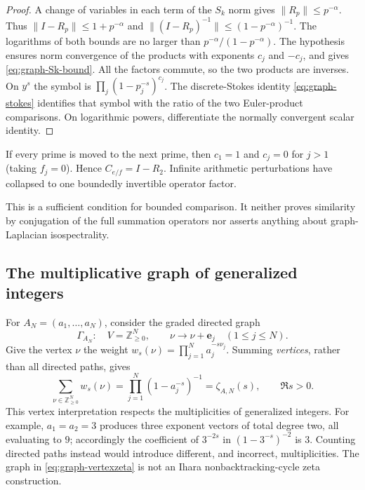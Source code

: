 \begin{proof}
A change of variables in each term of the $S_k$ norm gives
$\|R_p\|\le p^{-\alpha}$. Thus
$\|I-R_p\|\le1+p^{-\alpha}$ and
$\|(I-R_p)^{-1}\|\le(1-p^{-\alpha})^{-1}$.
The logarithms of both bounds are no larger than
$p^{-\alpha}/(1-p^{-\alpha})$.
The hypothesis ensures norm convergence of the products
with exponents $c_j$ and $-c_j$, and gives
\eqref{eq:graph-Sk-bound}. All the factors commute, so the
two products are inverses.
On $y^s$ the symbol is
$\prod_j(1-p_j^{-s})^{c_j}$.
The discrete-Stokes identity \eqref{eq:graph-stokes}
identifies that symbol with the ratio of the two
Euler-product comparisons. On logarithmic powers,
differentiate the normally convergent scalar identity.
\end{proof}

\begin{example}
If every prime is moved to the next prime, then
$c_1=1$ and $c_j=0$ for $j>1$ (taking $f_j=0$).
Hence $C_{e/f}=I-R_2$. Infinite arithmetic
perturbations have collapsed to one boundedly invertible
operator factor.
\end{example}

\begin{remark}
This is a sufficient condition for bounded comparison.
It neither proves similarity by conjugation of the full
summation operators nor asserts anything about graph-Laplacian
isospectrality.
\end{remark}

\subsection{The multiplicative graph of generalized integers}

For \(A_N=(a_1,\ldots,a_N)\), consider the graded directed graph
\[
 \Gamma_{A_N}:\quad
 V=\mathbb Z_{\ge0}^{N},\qquad
 \nu\longrightarrow \nu+\mathbf e_j\quad(1\le j\le N).
\]
Give the vertex \(\nu\) the weight
\(w_s(\nu)=\prod_{j=1}^N a_j^{-s\nu_j}\).
Summing \emph{vertices}, rather than all directed paths, gives
\begin{equation}\label{eq:graph-vertexzeta}
 \sum_{\nu\in\mathbb Z_{\ge0}^N}w_s(\nu)
 =\prod_{j=1}^N(1-a_j^{-s})^{-1}
 =\zeta_{A,N}(s),\qquad\Re s>0.
\end{equation}
This vertex interpretation respects the multiplicities of
generalized integers.  For example, \(a_1=a_2=3\) produces
three exponent vectors of total degree two, all evaluating to \(9\);
accordingly the coefficient of \(3^{-2s}\) in
\((1-3^{-s})^{-2}\) is \(3\).  Counting directed paths instead
would introduce different, and incorrect, multiplicities.
The graph in \eqref{eq:graph-vertexzeta} is not an Ihara
nonbacktracking-cycle zeta construction.

